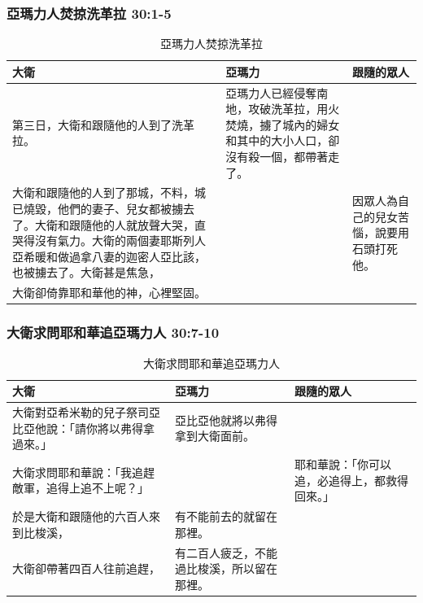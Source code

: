 \subsubsection{亞瑪力人焚掠洗革拉 30:1-5}
\begin{table}[H]
\hspace*{-5mm}
\centering
\begin{tabular}{p{}|p{6.25cm}|p{}}\hline\hline
大衛&亞瑪力&跟隨的眾人\\\hline
第三日，大衛和跟隨他的人到了洗革拉。
&亞瑪力人已經侵奪南地，攻破洗革拉，用火焚燒，擄了城內的婦女和其中的大小人口，卻沒有殺一個，都帶著走了。&\\\hline
大衛和跟隨他的人到了那城，不料，城已燒毀，他們的妻子、兒女都被擄去了。大衛和跟隨他的人就放聲大哭，直哭得沒有氣力。大衛的兩個妻耶斯列人亞希暖和做過拿八妻的迦密人亞比該，也被擄去了。大衛甚是焦急，&&因眾人為自己的兒女苦惱，說要用石頭打死他。\\\hline
大衛卻倚靠耶和華他的神，心裡堅固。 &&\\\hline
\end{tabular}
\caption{亞瑪力人焚掠洗革拉}
\end{table}


\subsubsection{大衛求問耶和華追亞瑪力人 30:7-10}
\begin{table}[H]
\hspace*{-5mm}
\centering
\begin{tabular}{p{6.25cm}|p{}|p{}}\hline\hline
大衛&亞瑪力&跟隨的眾人\\\hline
大衛對亞希米勒的兒子祭司亞比亞他說：「請你將以弗得拿過來。」
&亞比亞他就將以弗得拿到大衛面前。&\\\hline
大衛求問耶和華說：「我追趕敵軍，追得上追不上呢？」&&耶和華說：「你可以追，必追得上，都救得回來。」\\\hline
於是大衛和跟隨他的六百人來到比梭溪，&有不能前去的就留在那裡。 &\\\hline
大衛卻帶著四百人往前追趕，&有二百人疲乏，不能過比梭溪，所以留在那裡。&\\\hline
\end{tabular}
\caption{大衛求問耶和華追亞瑪力人}
\end{table}


